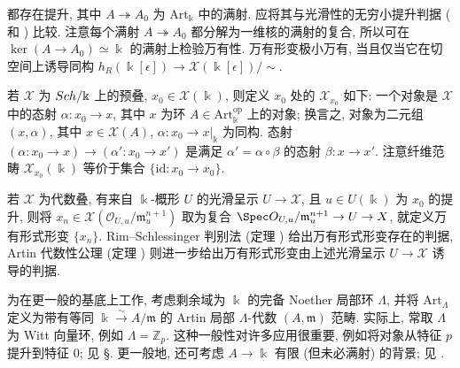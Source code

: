 都存在提升, 其中 $A\twoheadrightarrow A_0$ 为 $\mathrm{Art}_{\Bbbk}$ 中的满射. 应将其与光滑性的无穷小提升判据 ( 和 ) 比较. 注意每个满射 $A\twoheadrightarrow A_0$ 都分解为一维核的满射的复合, 所以可在 $\ker(A\to A_0)\simeq\Bbbk$ 的满射上检验万有性. 万有形变极小万有, 当且仅当它在切空间上诱导同构 $h_R(\Bbbk[\epsilon])\to\mathcal X(\Bbbk[\epsilon])/{\sim}$.
\begin{remark}[从整体预叠到局部形变预叠]\label{src:C.4.4}
若 $\mathcal X$ 为 $Sch/\Bbbk$ 上的预叠, $x_0\in\mathcal X(\Bbbk)$, 则定义 $x_0$ 处的 $\mathcal X_{x_0}$ 如下: 一个对象是 $\mathcal X$ 中的态射 $\alpha:x_0\to x$, 其中 $x$ 为环 $A\in\mathrm{Art}_{\Bbbk}^{\mathrm{op}}$ 上的对象; 换言之, 对象为二元组 $(x,\alpha)$, 其中 $x\in\mathcal X(A)$, $\alpha:x_0\to x|_{\Bbbk}$ 为同构. 态射 $(\alpha:x_0\to x)\to(\alpha':x_0\to x')$ 是满足 $\alpha'=\alpha\circ\beta$ 的态射 $\beta:x\to x'$. 注意纤维范畴 $\mathcal X_{x_0}(\Bbbk)$ 等价于集合 $\{\mathrm{id}:x_0\to x_0\}$.

若 $\mathcal X$ 为代数叠, 有来自 $\Bbbk$-概形 $U$ 的光滑呈示 $U\to\mathcal X$, 且 $u\in U(\Bbbk)$ 为 $x_0$ 的提升, 则将 $x_n\in\mathcal X(\mathcal O_{U,u}/\mathfrak m_u^{n+1})$ 取为复合 $\Spec\mathcal O_{U,u}/\mathfrak m_u^{n+1}\to U\to\mathcal X$, 就定义万有形式形变 $\{x_n\}$. Rim--Schlessinger 判别法 (定理 ) 给出万有形式形变存在的判据, Artin 代数性公理 (定理 ) 则进一步给出万有形式形变由上述光滑呈示 $U\to\mathcal X$ 诱导的判据.
\end{remark}
\begin{remark}\label{src:C.4.5}
为在更一般的基底上工作, 考虑剩余域为 $\Bbbk$ 的完备 Noether 局部环 $\Lambda$, 并将 $\mathrm{Art}_\Lambda$ 定义为带有等同 $\Bbbk\xrightarrow{\sim}A/\mathfrak m$ 的 Artin 局部 $\Lambda$-代数 $(A,\mathfrak m)$ 范畴. 实际上, 常取 $\Lambda$ 为 Witt 向量环, 例如 $\Lambda=\mathbb Z_p$. 这种一般性对许多应用很重要, 例如将对象从特征 $p$ 提升到特征 $0$; 见 \S{}. 更一般地, 还可考虑 $A\to\Bbbk$ 有限 (但未必满射) 的背景; 见 \cite[Tag 06GB]{SP}.
\end{remark}
